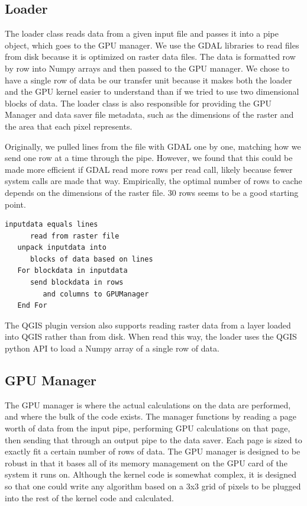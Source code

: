 \documentclass[journal]{IEEEtran}
\begin{document}
    \subsection{Loader}
    The loader class reads data from a given input file and passes it into
    a pipe object, which goes to the GPU manager. We use the GDAL libraries to
    read files from disk because it is optimized on raster data files. The data is
    formatted row by row into Numpy arrays and then passed to the GPU manager.
    We chose to have a single row of data be our transfer unit because it makes
    both the loader and the GPU kernel easier to understand than if we tried to
    use two dimensional blocks of data. The loader class is also responsible
    for providing the GPU Manager and data saver file metadata, such as the
    dimensions of the raster and the area that each pixel represents.

    Originally, we pulled lines from the file with GDAL one by one, matching
    how we send one row at a time through the pipe. However, we found that this
    could be made more efficient if GDAL read more rows per read call, likely
    because fewer system calls are made that way. Empirically, the optimal number
    of rows to cache depends on the dimensions of the raster file. 30 rows seems
    to be a good starting point.

\begin{Verbatim}[frame=single, gobble=2]
   inputdata equals lines 
      read from raster file
   unpack inputdata into 
      blocks of data based on lines
   For blockdata in inputdata
      send blockdata in rows 
         and columns to GPUManager
   End For	
\end{Verbatim}

    The QGIS plugin version also supports reading raster data from a layer loaded
    into QGIS rather than from disk. When read this way, the loader uses the QGIS
    python API to load a Numpy array of a single row of data.

    \subsection{GPU Manager}
    The GPU manager is where the actual calculations on the data are performed,
    and where the bulk of the code exists. The manager functions by reading a
    page worth of data from the input pipe, performing GPU calculations on that
    page, then sending that through an output pipe to the data saver. Each page
    is sized to exactly fit a certain number of rows of data. The GPU manager
    is designed to be robust in that it bases all of its memory management on
    the GPU card of the system it runs on. Although the kernel code is somewhat
    complex, it is designed so that one could write any algorithm based on a
    3x3 grid of pixels to be plugged into the rest of the kernel code and calculated.
\end{document}
